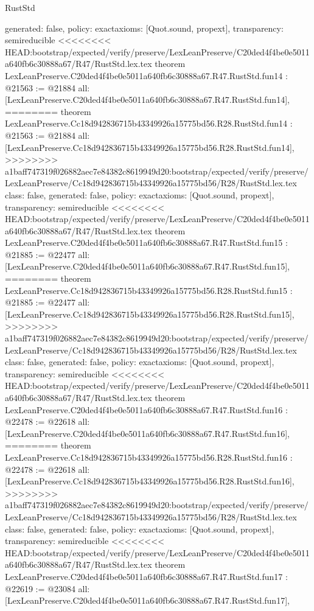 \begin{lexlean}{RustStd}
\begin{coremodule}
{\begin{coremodule}
{{{{{{{{{{{{{{{{{  generated: false,
  policy: exact{axioms: [Quot.sound, propext]},
  transparency: semireducible
}
<<<<<<<< HEAD:bootstrap/expected/verify/preserve/LexLeanPreserve/C20ded4f4be0e5011a640fb6c30888a67/R47/RustStd.lex.tex
theorem LexLeanPreserve.C20ded4f4be0e5011a640fb6c30888a67.R47.RustStd.fun14 : @21563 := @21884 {
  all: [LexLeanPreserve.C20ded4f4be0e5011a640fb6c30888a67.R47.RustStd.fun14],
========
theorem LexLeanPreserve.Cc18d942836715b43349926a15775bd56.R28.RustStd.fun14 : @21563 := @21884 {
  all: [LexLeanPreserve.Cc18d942836715b43349926a15775bd56.R28.RustStd.fun14],
>>>>>>>> a1baff747319f026882aec7e84382c8619949d20:bootstrap/expected/verify/preserve/LexLeanPreserve/Cc18d942836715b43349926a15775bd56/R28/RustStd.lex.tex
  class: false,
  generated: false,
  policy: exact{axioms: [Quot.sound, propext]},
  transparency: semireducible
}
<<<<<<<< HEAD:bootstrap/expected/verify/preserve/LexLeanPreserve/C20ded4f4be0e5011a640fb6c30888a67/R47/RustStd.lex.tex
theorem LexLeanPreserve.C20ded4f4be0e5011a640fb6c30888a67.R47.RustStd.fun15 : @21885 := @22477 {
  all: [LexLeanPreserve.C20ded4f4be0e5011a640fb6c30888a67.R47.RustStd.fun15],
========
theorem LexLeanPreserve.Cc18d942836715b43349926a15775bd56.R28.RustStd.fun15 : @21885 := @22477 {
  all: [LexLeanPreserve.Cc18d942836715b43349926a15775bd56.R28.RustStd.fun15],
>>>>>>>> a1baff747319f026882aec7e84382c8619949d20:bootstrap/expected/verify/preserve/LexLeanPreserve/Cc18d942836715b43349926a15775bd56/R28/RustStd.lex.tex
  class: false,
  generated: false,
  policy: exact{axioms: [Quot.sound, propext]},
  transparency: semireducible
}
<<<<<<<< HEAD:bootstrap/expected/verify/preserve/LexLeanPreserve/C20ded4f4be0e5011a640fb6c30888a67/R47/RustStd.lex.tex
theorem LexLeanPreserve.C20ded4f4be0e5011a640fb6c30888a67.R47.RustStd.fun16 : @22478 := @22618 {
  all: [LexLeanPreserve.C20ded4f4be0e5011a640fb6c30888a67.R47.RustStd.fun16],
========
theorem LexLeanPreserve.Cc18d942836715b43349926a15775bd56.R28.RustStd.fun16 : @22478 := @22618 {
  all: [LexLeanPreserve.Cc18d942836715b43349926a15775bd56.R28.RustStd.fun16],
>>>>>>>> a1baff747319f026882aec7e84382c8619949d20:bootstrap/expected/verify/preserve/LexLeanPreserve/Cc18d942836715b43349926a15775bd56/R28/RustStd.lex.tex
  class: false,
  generated: false,
  policy: exact{axioms: [Quot.sound, propext]},
  transparency: semireducible
}
<<<<<<<< HEAD:bootstrap/expected/verify/preserve/LexLeanPreserve/C20ded4f4be0e5011a640fb6c30888a67/R47/RustStd.lex.tex
theorem LexLeanPreserve.C20ded4f4be0e5011a640fb6c30888a67.R47.RustStd.fun17 : @22619 := @23084 {
  all: [LexLeanPreserve.C20ded4f4be0e5011a640fb6c30888a67.R47.RustStd.fun17],
}}}}}}}}}}}}}}}}}}}}
\end{coremodule}}
\end{coremodule}
\end{lexlean}

